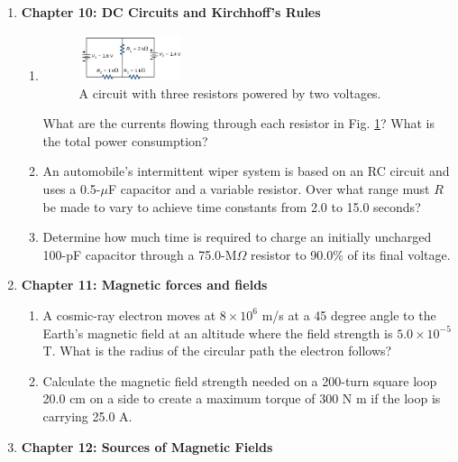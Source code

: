 \documentclass[10pt]{article}
\begin{document}
\begin{enumerate}
\item \textbf{Chapter 10: DC Circuits and Kirchhoff's Rules}
\begin{enumerate}
\item 
\begin{figure}[ht]
\centering
\includegraphics[width=0.3\textwidth]{circuit1.png}
\caption{\label{fig:circuit1} A circuit with three resistors powered by two voltages.}
\end{figure}
What are the currents flowing through each resistor in Fig. \ref{fig:circuit1}?  What is the total power consumption? \\ \vspace{8cm}
\item  An automobile’s intermittent wiper system is based on an RC circuit and uses a 0.5-$\mu$F capacitor and a variable resistor. Over what range must $R$ be made to vary to achieve time constants from 2.0 to 15.0 seconds? \\ \vspace{2cm}
\item Determine how much time is required to charge an initially uncharged 100-pF capacitor through a 75.0-M$\Omega$ resistor to 90.0\% of its final voltage. \\ \vspace{2.5cm}
\end{enumerate}
\item \textbf{Chapter 11: Magnetic forces and fields}
\begin{enumerate}
\item A cosmic-ray electron moves at $8 \times 10^6$ m/s at a 45 degree angle to the Earth’s magnetic field at an altitude where the field strength is $5.0 \times 10^{-5}$ T. What is the radius of the circular path the electron follows? \\ \vspace{1.5 cm}
\item Calculate the magnetic field strength needed on a 200-turn square loop 20.0 cm on a side to create a maximum torque of 300 N m if the loop is carrying 25.0 A. \\ \vspace{2cm}
\end{enumerate}
\item \textbf{Chapter 12: Sources of Magnetic Fields}

\end{enumerate}
\end{document}
